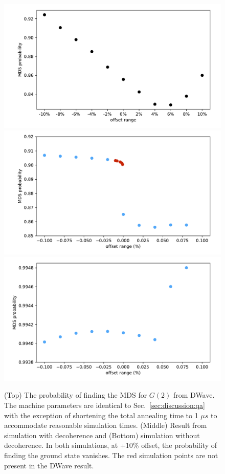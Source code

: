 \documentclass[prd,twocolumn,tightenlines,preprintnumbers,showpacs,superscriptaddress,notitlepage,nofootinbib,eqsecnum,floatfix,longbibliography]{revtex4}
\begin{document}
\begin{figure}
    \centering
    \includegraphics[width=\columnwidth]{./figures/dwave1us.pdf}
    \includegraphics[width=\columnwidth]{./figures/sim_deco.pdf}
    \includegraphics[width=\columnwidth]{./figures/sim_nodeco.pdf}
    \caption{ (Top) The probability of finding the MDS for $G(2)$ from DWave.
The machine parameters are identical to Sec.~\ref{sec:discussion:qa} with the exception of shortening the total annealing time to 1 $\mu s$ to accommodate reasonable simulation times.
(Middle) Result from simulation with decoherence and (Bottom) simulation without decoherence.
In both simulations, at +10\% offset, the probability of finding the ground state vanishes.
The red simulation points are not present in the DWave result.}
    \label{fig:dwave1us}
\end{figure}
\end{document}
